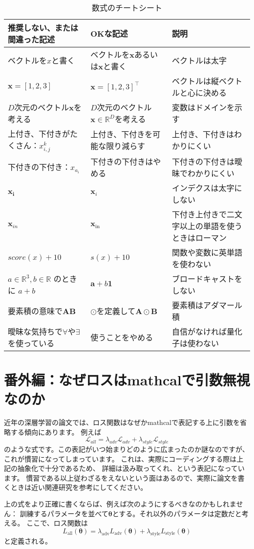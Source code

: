 \documentclass[uplatex,twocolumn,9pt,dvipdfmx]{jsarticle}
\begin{document}
\begin{table*}
    \centering
    \begin{tabular}{@{}lll@{}} \toprule
        推奨しない、または間違った記述 & OKな記述 & 説明 \\ \midrule
        ベクトルを$x$と書く & ベクトルを$\mathbf{x}$あるいは$\bm{x}$と書く & ベクトルは太字 \\
        $\mathbf{x} = [1, 2, 3]$ & $\mathbf{x} = [1, 2, 3]^\top$ & ベクトルは縦ベクトルと心に決める \\
        $D$次元のベクトル$\mathbf{x}$を考える & $D$次元のベクトル$\mathbf{x}\in\mathbb{R}^D$を考える & 変数はドメインを示す \\
        上付き、下付きがたくさん：$x_{i, j}^k$ & 上付き、下付きを可能な限り減らす & 上付き、下付きはわかりにくい \\
        下付きの下付き：$x_{a_i}$ & 下付きの下付きはやめる & 下付きの下付きは曖昧でわかりにくい \\
        $\mathbf{x_i}$ & $\mathbf{x}_i$ & インデクスは太字にしない \\
        $\mathbf{x}_{in}$ & $\mathbf{x}_\mathrm{in}$ & 下付き上付きで二文字以上の単語を使うときはローマン \\
        $score(x) + 10$ & $s(x) + 10$ & 関数や変数に英単語を使わない \\
        $a \in \mathbb{R}^3, b \in \mathbb{R}$ のときに $a + b$ & $\mathbf{a} + b\mathbf{1}$ & ブロードキャストをしない \\
        要素積の意味で$\mathbf{A}\mathbf{B}$ & $\odot$を定義して$\mathbf{A}\odot\mathbf{B}$ & 要素積はアダマール積 \\
        曖昧な気持ちで$\forall$や$\exists$を使っている & 使うことをやめる & 自信がなければ量化子は使わない \\
        \bottomrule
    \end{tabular}
    \caption{数式のチートシート}
    \label{tbl:cheatsheet}
\end{table*}


\section{番外編：なぜロスはmathcalで引数無視なのか}
近年の深層学習の論文では、ロス関数はなぜかmathcalで表記する上に引数を省略する傾向にあります。
例えば
\begin{equation}
    \mathcal{L}_{all} = \lambda_{adv}\mathcal{L}_{adv} + \lambda_{style}\mathcal{L}_{style}
\end{equation}
のような式です。この表記がいつ始まりどのように広まったのか謎なのですが、
これが慣習になってしまっています。
これは、実際にコーディングする際は上記の抽象化で十分であるため、
詳細は汲み取ってくれ、という表記になっています。
慣習である以上従わざるをえないという面はあるので、実際に論文を書くときは近い関連研究を参考にしてください。

上の式をより正確に書くならば、例えば次のようにするべきなのかもしれません：
訓練するパラメータを並べて$\bm{\theta}$とする。それ以外のパラメータは定数だと考える。
ここで、ロス関数は
\begin{equation}
    L_\mathrm{all}(\bm{\theta}) = \lambda_\mathrm{adv}L_\mathrm{adv}(\bm{\theta}) + \lambda_\mathrm{style}{L}_\mathrm{style}(\bm{\theta})
\end{equation}
と定義される。
\end{document}
